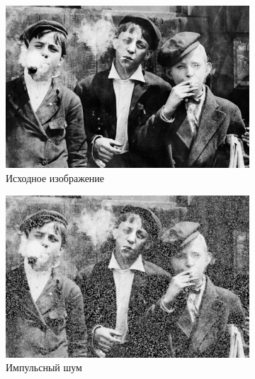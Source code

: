   \begin{figure}[ht] 
    \centering
    \begin{subfigure}[b]{0.5\linewidth}
        \centering
        \includegraphics[width=0.95\linewidth]{../lewis-hine-taschen-main-3.jpg} 
        \caption{Исходное изображение} 
        \label{contraharmonic_0.5:a} 
        \vspace{4ex}
    \end{subfigure}%
    \begin{subfigure}[b]{0.5\linewidth}
      \centering
      \includegraphics[width=0.95\linewidth]{../Contraharmonic_Filter/Contraharmonic_Impulse_noise_(m,n=(3,_3),q=0.5).jpg} 
      \caption{Импульсный шум} 
      \label{contraharmonic_0.5:b} 
      \vspace{4ex}
    \end{subfigure}
    \begin{subfigure}[b]{0.5\linewidth}
      \centering

\end{subfigure}
\end{figure}
